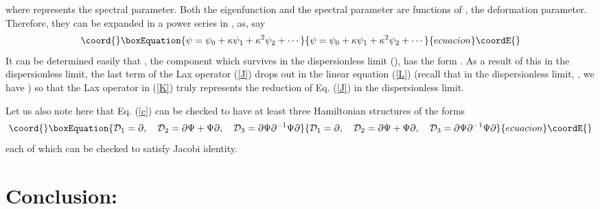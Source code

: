 \documentclass[a4paper,11pt]{article}
\begin{document}
where \myHighlight{$\lambda$}\coordHE{} represents the spectral parameter. Both the
eigenfunction and the spectral parameter are functions of \myHighlight{$\kappa$}\coordHE{},
the deformation parameter. Therefore, they can be expanded in a power
series in \myHighlight{$\kappa$}\coordHE{}, as, say
\begin{equation}\coord{}\boxEquation{
\psi = \psi_{0} + \kappa \psi_{1} + \kappa^{2} \psi_{2} +\cdots
}{
\psi = \psi_{0} + \kappa \psi_{1} + \kappa^{2} \psi_{2} +\cdots
}{ecuacion}\coordE{}\end{equation}
It can be determined easily that \coordHE{}, the component which survives in
the dispersionless limit (\coordHE{}), has the form
\coordHE{}. As a result of this in the dispersionless
limit, the last term of the Lax operator (\ref{J}) drops out in the
linear equation (\ref{L}) (recall that in the dispersionless limit,
\coordHE{}, we have \coordHE{}) so that the Lax operator
in (\ref{K}) truly represents the reduction of Eq. (\ref{J}) in the
dispersionless limit.

Let us also note here that Eq. (\ref{c}) can be checked to have at
least three Hamiltonian structures of the forms
\begin{equation}\coord{}\boxEquation{
{\cal D}_{1} = \partial,\quad {\cal D}_{2} = \partial \Psi +
\Psi\partial,\quad {\cal D}_{3} =
\partial\Psi\partial^{-1}\Psi\partial
}{
{\cal D}_{1} = \partial,\quad {\cal D}_{2} = \partial \Psi +
\Psi\partial,\quad {\cal D}_{3} =
\partial\Psi\partial^{-1}\Psi\partial
}{ecuacion}\coordE{}\end{equation}
each of which can be checked to satisfy Jacobi identity.

\section{Conclusion:}
\end{document}
